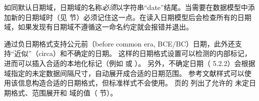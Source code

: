如同默认日期域，日期域的名称\emph{必须}以字符串“date”结尾。当需要在数据模型中添加新的日期域时（见  节）必须记住这一点。\biblatex 在读入日期模型后会检查所有的日期域，如果发现有日期域不遵循这一命名约定就会报错并退出。

 通过负日期格式支持公元前（before common era, BCE/BC）日期，此外还支持“近似”（circa）和不确定的日期。
这样的日期格式设置可以检测的内部标记，进而可以插入合适的本地化标记（例如   或 ）。
另外，不确定日期（ 5.2.2）会根据 域指定的未定数据间隔尺寸，自动展开成合适的日期范围。
参考文献样式可以使用该信息构造合适的日期格式，但标准样式不会使用。
\pageref{bib:use:tab3} 页的 列出了允许的  未定日期格式、范围展开和  域的值（ 节）。

